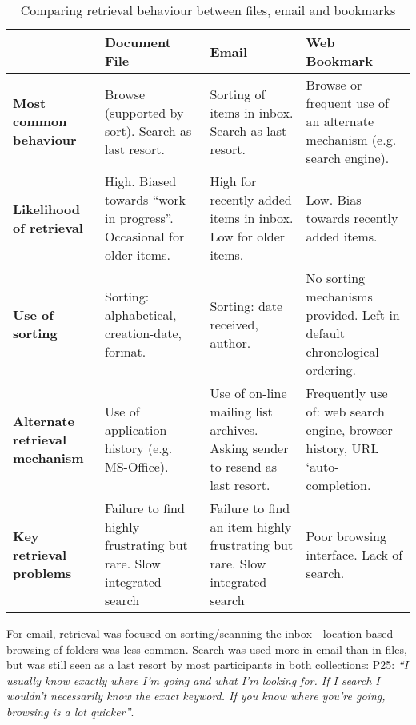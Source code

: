 \begin{table}[hbtp]
\begin{center}
\begin{footnotesize}
\setlength{\extrarowheight}{2pt}
\begin{tabular}{|p{2.5cm}|p{3.5cm}|p{3.5cm}|p{3.5cm}|}
\hline
    {\bf } & {\bf Document File} & {\bf Email} & {\bf Web Bookmark} \\
\hline
{\bf Most common behaviour} & Browse (supported by sort). Search as last resort. & Sorting of items in inbox. Search as last resort. & Browse or frequent use of an alternate  mechanism  (e.g. search engine). \\
\hline
{\bf Likelihood of retrieval} & High. Biased towards  ``work in progress''. Occasional for older items. & High for recently added items in inbox. Low for older items. & Low. Bias towards recently added items. \\
\hline
{\bf Use of sorting} & Sorting: alphabetical, creation-date, format. & Sorting: date received, author. & No sorting mechanisms provided. Left in default chronological ordering.  \\
\hline
{\bf Alternate retrieval mechanism} & Use of application history  (e.g. MS-Office). & Use of on-line mailing list archives. Asking sender to resend as last resort. & Frequently use of: web search engine, browser history, URL `auto-completion. \\
\hline
{\bf Key retrieval problems} & Failure to find highly frustrating but rare. Slow integrated search & Failure to find an item highly frustrating but rare. Slow integrated search & Poor browsing interface. Lack of search.  \\
\hline
\end{tabular}  
\end{footnotesize}
\caption{Comparing retrieval behaviour between files, email and bookmarks}
\label{table:chapter3_retrieval_strategy}
\end{center}
\end{table}





For email, retrieval was focused on sorting/scanning the inbox - location-based browsing of folders was less common. Search was used more in email than in files, but was still seen as a last resort by most participants in both collections: P25: \textit{``I usually know exactly where I'm going and what I'm looking for. If I search I wouldn't necessarily know the exact keyword. If you know where you're going, browsing is a lot quicker''}.

